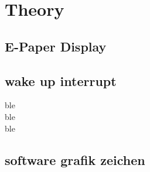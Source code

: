 \chapter{Theory}

\section{E-Paper Display}


\section{wake up interrupt}
\acf{ble}\\
\acs{ble}\\
\acl{ble}

\section{software grafik zeichen}